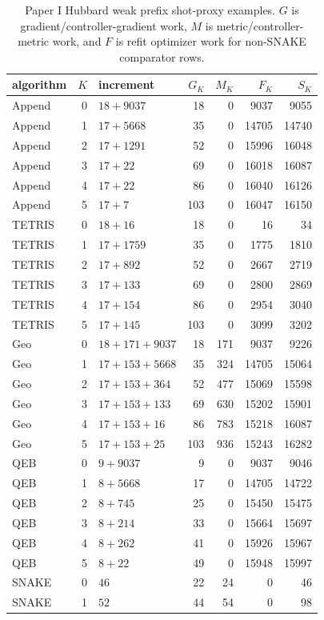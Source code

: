 \documentclass[10pt,twocolumn]{article}
\begin{document}
\begin{table}[t]
\centering
\scriptsize
\begin{tabular}{@{}lrlrrrr@{}}
\hline
algorithm & \(K\) & increment & \(G_K\) & \(M_K\) & \(F_K\) & \(S_K\)\\
\hline
Append & 0 & \(18+9037\) & 18 & 0 & 9037 & 9055\\
Append & 1 & \(17+5668\) & 35 & 0 & 14705 & 14740\\
Append & 2 & \(17+1291\) & 52 & 0 & 15996 & 16048\\
Append & 3 & \(17+22\) & 69 & 0 & 16018 & 16087\\
Append & 4 & \(17+22\) & 86 & 0 & 16040 & 16126\\
Append & 5 & \(17+7\) & 103 & 0 & 16047 & 16150\\
\hline
TETRIS & 0 & \(18+16\) & 18 & 0 & 16 & 34\\
TETRIS & 1 & \(17+1759\) & 35 & 0 & 1775 & 1810\\
TETRIS & 2 & \(17+892\) & 52 & 0 & 2667 & 2719\\
TETRIS & 3 & \(17+133\) & 69 & 0 & 2800 & 2869\\
TETRIS & 4 & \(17+154\) & 86 & 0 & 2954 & 3040\\
TETRIS & 5 & \(17+145\) & 103 & 0 & 3099 & 3202\\
\hline
Geo & 0 & \(18+171+9037\) & 18 & 171 & 9037 & 9226\\
Geo & 1 & \(17+153+5668\) & 35 & 324 & 14705 & 15064\\
Geo & 2 & \(17+153+364\) & 52 & 477 & 15069 & 15598\\
Geo & 3 & \(17+153+133\) & 69 & 630 & 15202 & 15901\\
Geo & 4 & \(17+153+16\) & 86 & 783 & 15218 & 16087\\
Geo & 5 & \(17+153+25\) & 103 & 936 & 15243 & 16282\\
\hline
QEB & 0 & \(9+9037\) & 9 & 0 & 9037 & 9046\\
QEB & 1 & \(8+5668\) & 17 & 0 & 14705 & 14722\\
QEB & 2 & \(8+745\) & 25 & 0 & 15450 & 15475\\
QEB & 3 & \(8+214\) & 33 & 0 & 15664 & 15697\\
QEB & 4 & \(8+262\) & 41 & 0 & 15926 & 15967\\
QEB & 5 & \(8+22\) & 49 & 0 & 15948 & 15997\\
\hline
SNAKE & 0 & \(46\) & 22 & 24 & 0 & 46\\
SNAKE & 1 & \(52\) & 44 & 54 & 0 & 98\\
\hline
\end{tabular}
\caption{\footnotesize Paper I Hubbard weak prefix shot-proxy examples.  \(G\)
is gradient/controller-gradient work, \(M\) is metric/controller-metric work,
and \(F\) is refit optimizer work for non-SNAKE comparator rows.}
\end{table}
\end{document}
